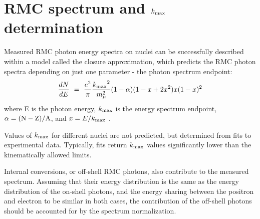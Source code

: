 \newpage
\section {RMC spectrum and $\mbox{$k_{\rm max}$}$ determination}

Measured RMC photon energy spectra on nuclei can be successfully described
within a model called the closure approximation, which predicts the RMC photon
spectra depending on just one parameter - the photon spectrum endpoint:
$$
    \frac{dN}{dE} ~=~ \frac{e^2}{\pi} \frac{\mbox{$k_{\rm max}$}^2}{ m_{\mu}^2} (1 - \alpha) (1-x+2x^2)x(1-x)^2
$$
where E is the photon energy, $\mbox{$k_{\rm max}$}$ is the energy spectrum endpoint, $\rm \alpha = (N-Z)/A$,
and $x = E/\mbox{$k_{\rm max}$}$ \cite{Christillin_1980}.

Values of $\mbox{$k_{\rm max}$}$ for different nuclei are not predicted, but determined from fits
to experimental data. Typically, fits return $\mbox{$k_{\rm max}$}$ values significantly lower than
the kinematically allowed limits. 

Internal conversions, or off-shell RMC photons, also contribute to the measured
spectrum. Assuming that their energy distribution is the same as the energy distribution
of the on-shell photons, and the energy sharing between the positron and electron
to be similar in both cases, the contribution of the off-shell photons should be
accounted for by the spectrum normalization.

